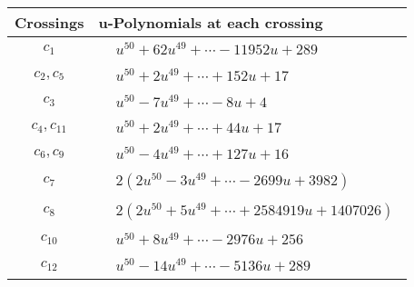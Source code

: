 \documentclass[1p]{elsarticle_modified}
\theoremstyle{definition}
\begin{document}
\begin{tabular}{m{50pt}|m{274pt}}
Crossings & \hspace{64pt}u-Polynomials at each crossing \\
\hline $$\begin{aligned}c_{1}\end{aligned}$$&$\begin{aligned}
&u^{50}+62 u^{49}+\cdots-11952 u+289
\end{aligned}$\\
\hline $$\begin{aligned}c_{2},c_{5}\end{aligned}$$&$\begin{aligned}
&u^{50}+2 u^{49}+\cdots+152 u+17
\end{aligned}$\\
\hline $$\begin{aligned}c_{3}\end{aligned}$$&$\begin{aligned}
&u^{50}-7 u^{49}+\cdots-8 u+4
\end{aligned}$\\
\hline $$\begin{aligned}c_{4},c_{11}\end{aligned}$$&$\begin{aligned}
&u^{50}+2 u^{49}+\cdots+44 u+17
\end{aligned}$\\
\hline $$\begin{aligned}c_{6},c_{9}\end{aligned}$$&$\begin{aligned}
&u^{50}-4 u^{49}+\cdots+127 u+16
\end{aligned}$\\
\hline $$\begin{aligned}c_{7}\end{aligned}$$&$\begin{aligned}
&2(2 u^{50}-3 u^{49}+\cdots-2699 u+3982)
\end{aligned}$\\
\hline $$\begin{aligned}c_{8}\end{aligned}$$&$\begin{aligned}
&2(2 u^{50}+5 u^{49}+\cdots+2584919 u+1407026)
\end{aligned}$\\
\hline $$\begin{aligned}c_{10}\end{aligned}$$&$\begin{aligned}
&u^{50}+8 u^{49}+\cdots-2976 u+256
\end{aligned}$\\
\hline $$\begin{aligned}c_{12}\end{aligned}$$&$\begin{aligned}
&u^{50}-14 u^{49}+\cdots-5136 u+289
\end{aligned}$\\
\hline
\end{tabular}\\~\\
\end{document}
